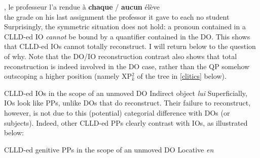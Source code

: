 \documentclass[output=paper]{langsci/langscibook}
\begin{document}
\ea
    ,       le     professeur        l'a rendue
\`{a}  \textbf{chaque} / \textbf{aucun}   \'{e}l\`{e}ve\\
    {}  the    grade  on  his    last       assignment  the   professor   it
     gave      to  each {} no        student\\
\z
%
Surprisingly, the symmetric situation does not hold: a pronoun contained in a
\gls{CLLD}-ed IO {\it cannot} be bound by a quantifier contained in the DO.
This shows that  \gls{CLLD}-ed \glspl{IO} cannot totally reconstruct.
I will return below to the question of why. Note that the DO/IO reconstruction
contrast also shows that total reconstruction is indeed involved in the DO
case, rather than the QP somehow outscoping a higher position (namely XP$_k^2$
of the tree in \eqref{clitics} below).

\ea *CLLD-ed IOs in the scope of an unmoved DO \hfill{Indirect object  {\it lui}} \label{scofree}
\z
\z
%
Superficially, \glspl{IO} look like PPs, unlike \glspl{DO} that do reconstruct.
Their failure to reconstruct, however, is not due to this (potential)
categorial difference with \glspl{DO} (or subjects). Indeed, other
\gls{CLLD}-ed PPs clearly contrast with \glspl{IO}, as illustrated below:

\ea \gls{CLLD}-ed genitive PPs in the scope of an unmoved DO \hfill{Locative {\it en}}
\z
\z
\end{document}
